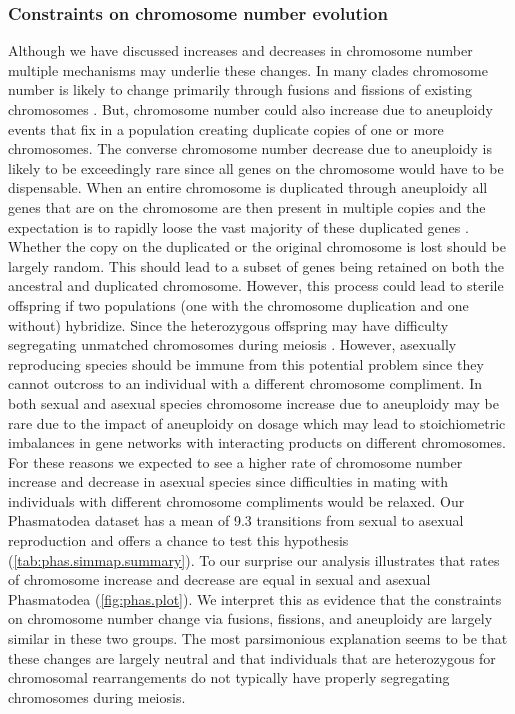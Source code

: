 \subsubsection{Constraints on chromosome number evolution}
Although we have discussed increases and decreases in chromosome number multiple mechanisms may underlie these changes.
In many clades chromosome number is likely to change primarily through fusions and fissions of existing chromosomes \citep{sved2016, blackmon2019meiotic}.
But, chromosome number could also increase due to aneuploidy events that fix in a population creating duplicate copies of one or more chromosomes.
The converse chromosome number decrease due to aneuploidy is likely to be exceedingly rare since all genes on the chromosome would have to be dispensable.
When an entire chromosome is duplicated through aneuploidy all genes that are on the chromosome are then present in multiple copies and the expectation is to rapidly loose the vast majority of these duplicated genes \citep{ohno}.
Whether the copy on the duplicated or the original chromosome is lost should be largely random.
This should lead to a subset of genes being retained on both the ancestral and duplicated chromosome.
However, this process could lead to sterile offspring if two populations (one with the chromosome duplication and one without) hybridize.
Since the heterozygous offspring may have difficulty segregating unmatched chromosomes during meiosis \citep{white1978}.
However, asexually reproducing species should be immune from this potential problem since they cannot outcross to an individual with a different chromosome compliment. 
In both sexual and asexual species chromosome increase due to aneuploidy may be rare due to the impact of aneuploidy on dosage which may lead to stoichiometric imbalances in gene networks with interacting products on different chromosomes.
For these reasons we expected to see a higher rate of chromosome number increase and decrease in asexual species since difficulties in mating with individuals with different chromosome compliments would be relaxed.
Our Phasmatodea dataset has a mean of 9.3 transitions from sexual to asexual reproduction and offers a chance to test this hypothesis (\cref{tab:phas.simmap.summary}).
To our surprise our analysis illustrates that rates of chromosome increase and decrease are equal in sexual and asexual Phasmatodea (\cref{fig:phas.plot}).
We interpret this as evidence that the constraints on chromosome number change via fusions, fissions, and aneuploidy are largely similar in these two groups. 
The most parsimonious explanation seems to be that these changes are largely neutral and that individuals that are heterozygous for chromosomal rearrangements do not typically have properly segregating chromosomes during meiosis.

